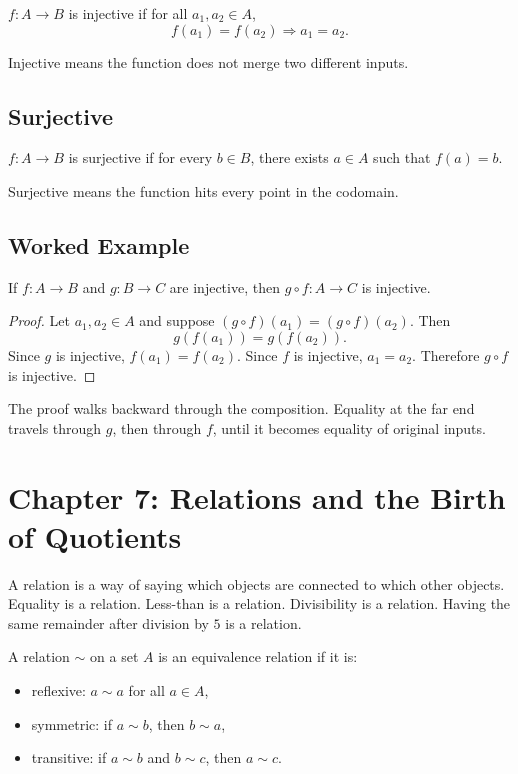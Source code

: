 \documentclass[11pt]{article}
\begin{document}
\begin{definition}
$f:A\to B$ is injective if for all $a_1,a_2\in A$,
\[
f(a_1)=f(a_2)\Rightarrow a_1=a_2.
\]
\end{definition}

Injective means the function does not merge two different inputs.

\subsection{Surjective}

\begin{definition}
$f:A\to B$ is surjective if for every $b\in B$, there exists $a\in A$ such that $f(a)=b$.
\end{definition}

Surjective means the function hits every point in the codomain.

\subsection{Worked Example}

\begin{theorem}
If $f:A\to B$ and $g:B\to C$ are injective, then $g\circ f:A\to C$ is injective.
\end{theorem}

\begin{proof}
Let $a_1,a_2\in A$ and suppose $(g\circ f)(a_1)=(g\circ f)(a_2)$. Then
\[
g(f(a_1))=g(f(a_2)).
\]
Since $g$ is injective, $f(a_1)=f(a_2)$. Since $f$ is injective, $a_1=a_2$. Therefore $g\circ f$ is injective.
\end{proof}

The proof walks backward through the composition. Equality at the far end travels through $g$, then through $f$, until it becomes equality of original inputs.

\section{Chapter 7: Relations and the Birth of Quotients}

A relation is a way of saying which objects are connected to which other objects. Equality is a relation. Less-than is a relation. Divisibility is a relation. Having the same remainder after division by $5$ is a relation.

\begin{definition}
A relation $\sim$ on a set $A$ is an equivalence relation if it is:
\begin{itemize}
\item reflexive: $a\sim a$ for all $a\in A$,
\item symmetric: if $a\sim b$, then $b\sim a$,
\item transitive: if $a\sim b$ and $b\sim c$, then $a\sim c$.
\end{itemize}
\end{definition}
\end{document}
